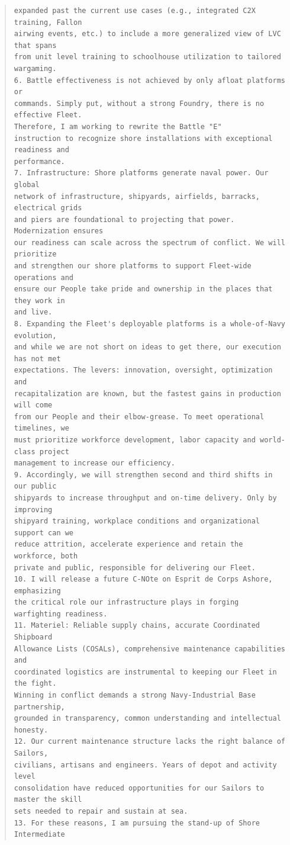 \documentclass[../main.tex]{subfiles}
\begin{document}
\begin{quote}
\begin{verbatim}
expanded past the current use cases (e.g., integrated C2X training, Fallon
airwing events, etc.) to include a more generalized view of LVC that spans
from unit level training to schoolhouse utilization to tailored wargaming.
6. Battle effectiveness is not achieved by only afloat platforms or
commands. Simply put, without a strong Foundry, there is no effective Fleet.
Therefore, I am working to rewrite the Battle "E"
instruction to recognize shore installations with exceptional readiness and
performance.
7. Infrastructure: Shore platforms generate naval power. Our global
network of infrastructure, shipyards, airfields, barracks, electrical grids
and piers are foundational to projecting that power. Modernization ensures
our readiness can scale across the spectrum of conflict. We will prioritize
and strengthen our shore platforms to support Fleet-wide operations and
ensure our People take pride and ownership in the places that they work in
and live.
8. Expanding the Fleet's deployable platforms is a whole-of-Navy evolution,
and while we are not short on ideas to get there, our execution has not met
expectations. The levers: innovation, oversight, optimization and
recapitalization are known, but the fastest gains in production will come
from our People and their elbow-grease. To meet operational timelines, we
must prioritize workforce development, labor capacity and world-class project
management to increase our efficiency.
9. Accordingly, we will strengthen second and third shifts in our public
shipyards to increase throughput and on-time delivery. Only by improving
shipyard training, workplace conditions and organizational support can we
reduce attrition, accelerate experience and retain the workforce, both
private and public, responsible for delivering our Fleet.
10. I will release a future C-NOte on Esprit de Corps Ashore, emphasizing
the critical role our infrastructure plays in forging warfighting readiness.
11. Materiel: Reliable supply chains, accurate Coordinated Shipboard
Allowance Lists (COSALs), comprehensive maintenance capabilities and
coordinated logistics are instrumental to keeping our Fleet in the fight.
Winning in conflict demands a strong Navy-Industrial Base partnership,
grounded in transparency, common understanding and intellectual honesty.
12. Our current maintenance structure lacks the right balance of Sailors,
civilians, artisans and engineers. Years of depot and activity level
consolidation have reduced opportunities for our Sailors to master the skill
sets needed to repair and sustain at sea.
13. For these reasons, I am pursuing the stand-up of Shore Intermediate

\end{verbatim}
\end{quote}
\end{document}
